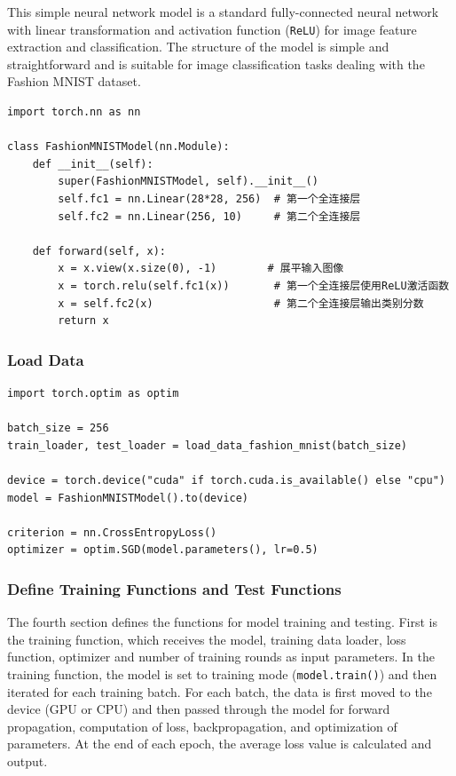 \documentclass[a4paper,12pt]{article}
\begin{document}
This simple neural network model is a standard fully-connected neural network with linear transformation and activation function (\texttt{ReLU}) for image feature extraction and classification. The structure of the model is simple and straightforward and is suitable for image classification tasks dealing with the Fashion MNIST dataset.

\begin{lstlisting}
import torch.nn as nn

class FashionMNISTModel(nn.Module):
    def __init__(self):
        super(FashionMNISTModel, self).__init__()
        self.fc1 = nn.Linear(28*28, 256)  # 第一个全连接层
        self.fc2 = nn.Linear(256, 10)     # 第二个全连接层

    def forward(self, x):
        x = x.view(x.size(0), -1)        # 展平输入图像
        x = torch.relu(self.fc1(x))       # 第一个全连接层使用ReLU激活函数
        x = self.fc2(x)                   # 第二个全连接层输出类别分数
        return x

\end{lstlisting}

\subsubsection{Load Data}

\begin{lstlisting}
import torch.optim as optim

batch_size = 256
train_loader, test_loader = load_data_fashion_mnist(batch_size)

device = torch.device("cuda" if torch.cuda.is_available() else "cpu")
model = FashionMNISTModel().to(device)

criterion = nn.CrossEntropyLoss()
optimizer = optim.SGD(model.parameters(), lr=0.5)

\end{lstlisting}

\subsubsection{Define Training Functions and Test Functions}
The fourth section defines the functions for model training and testing. First is the training function, which receives the model, training data loader, loss function, optimizer and number of training rounds as input parameters. In the training function, the model is set to training mode (\texttt{model.train()}) and then iterated for each training batch. For each batch, the data is first moved to the device (GPU or CPU) and then passed through the model for forward propagation, computation of loss, backpropagation, and optimization of parameters. At the end of each epoch, the average loss value is calculated and output.
\end{document}
